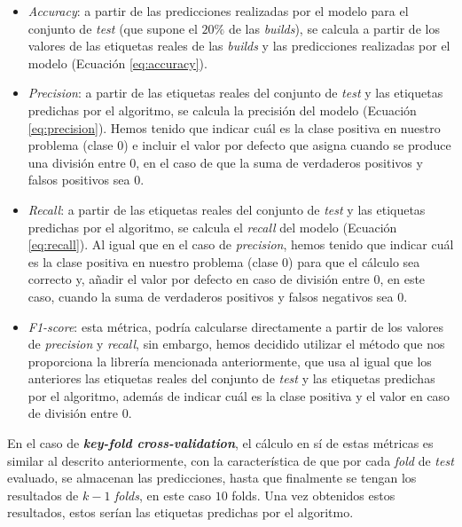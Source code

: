 \begin{itemize}
    \item \textit{Accuracy}: a partir de las predicciones realizadas por el modelo para el
    conjunto de \textit{test} (que supone el $20\%$ de las \textit{builds}), se calcula a
    partir de los valores de las etiquetas reales de las \textit{builds} y las predicciones
    realizadas por el modelo (Ecuación \eqref{eq:accuracy}).\\

    \item \textit{Precision}: a partir de las etiquetas reales del conjunto de \textit{test} y
    las etiquetas predichas por el algoritmo, se calcula la precisión del modelo
    (Ecuación \eqref{eq:precision}). Hemos tenido que indicar cuál es la clase positiva en nuestro problema
    (clase 0) e incluir el valor por defecto que asigna cuando se produce una división entre $0$,
    en el caso de que la suma de verdaderos positivos y falsos positivos sea $0$.\\

    \item \textit{Recall}: a partir de las etiquetas reales del conjunto de \textit{test} y las
    etiquetas predichas por el algoritmo, se calcula el \textit{recall} del modelo
    (Ecuación  \eqref{eq:recall}). Al igual que en el caso de \textit{precision}, hemos tenido que indicar
    cuál es la clase positiva en nuestro problema (clase 0) para que el cálculo sea correcto y,
    añadir el valor por defecto en caso de división entre $0$, en este caso, cuando la suma de
    verdaderos positivos y falsos negativos sea $0$.\\

    \item \textit{F1-score}: esta métrica, podría calcularse directamente a partir de los valores
    de \textit{precision} y \textit{recall}, sin embargo, hemos decidido utilizar el método que
    nos proporciona la librería mencionada anteriormente, que usa al igual que los anteriores las
    etiquetas reales del conjunto de \textit{test} y las etiquetas predichas por el algoritmo,
    además de indicar cuál es la clase positiva y el valor en caso de división entre $0$.\\
\end{itemize}

En el caso de \textbf{\textit{key-fold cross-validation}}, el cálculo en sí de estas métricas
es similar al descrito anteriormente, con la característica de que por cada \textit{fold} de
\textit{test} evaluado, se almacenan las predicciones, hasta que finalmente se tengan los
resultados de $k-1$ \textit{folds}, en este caso $10$ folds. Una vez obtenidos estos resultados,
estos serían las etiquetas predichas por el algoritmo.

